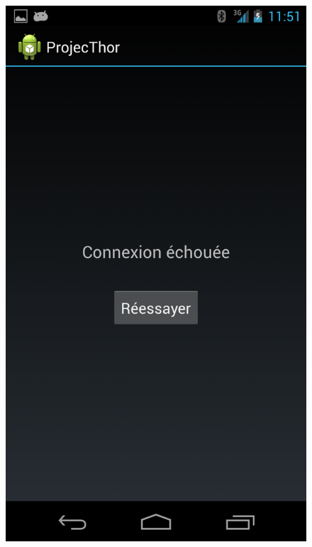 \begin{figure}
\begin{minipage}{0.45\textwidth}
		\center
		\includegraphics[scale=0.2]{view_0.png}
	\end{minipage}
	
	\vspace*{20mm}


\end{figure}
